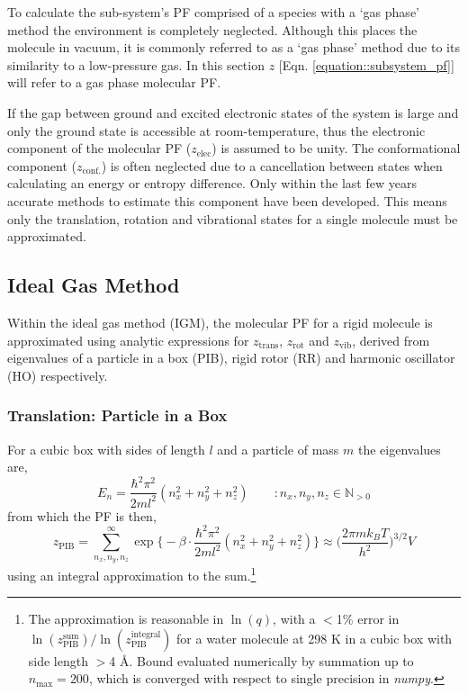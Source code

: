 \documentclass[../main.tex]{subfiles}
\begin{document}
To calculate the sub-system's PF comprised of a species with a `gas phase' method the environment is completely neglected. Although this places the molecule in vacuum, it is commonly referred to as a `gas phase' method due to its similarity to a low-pressure gas. In this section $z$ [Eqn. \eqref{equation::subsystem_pf}] will refer to a gas phase molecular PF.

If the gap between ground and excited electronic states of the system is large and only the ground state is accessible at room-temperature, thus the electronic component of the molecular PF ($z_\text{elec}$) is assumed to be unity. The conformational component ($z_\text{conf.}$) is often neglected due to a cancellation between states when calculating an energy or entropy difference. Only within the last few years accurate methods to estimate this component have been developed.\cite{Chan2021, grimme2021} This means only the translation, rotation and vibrational states for a single molecule must be approximated.

\subsection{Ideal Gas Method}

Within the ideal gas method (IGM), the molecular PF for a rigid molecule is approximated using analytic expressions for $z_\text{trans}$, $z_\text{rot}$ and $z_\text{vib}$, derived from eigenvalues of a particle in a box (PIB), rigid rotor (RR) and harmonic oscillator (HO) respectively.\cite{mcquarrie200}

\subsubsection{Translation: Particle in a Box}

For a cubic box with sides of length $l$ and a particle of mass $m$ the eigenvalues are,
\begin{equation}
E_n = \frac{\hbar^2 \pi^2}{2ml^2}(n_x^2 + n_y^2 + n_z^2) \qquad :  n_x, n_y, n_z \in \mathbb{N}_{>0}
\end{equation}
from which the PF is then,
\begin{equation}
z_\text{PIB} = \sum_{n_x, n_y, n_z}^\infty \exp{ {\Big \{} -{\beta}\cdot  \frac{\hbar^2 \pi^2}{2ml^2}(n_x^2 + n_y^2 + n_z^2)}{\Big \}} \approx  {\Big (} \frac{2\pi m k_B T}{h^2} {\Big )}^{3/2} V 
\label{equation::z_pib_integral}
\end{equation}
using an integral approximation to the sum.\footnote{The approximation is reasonable in $\ln(q)$, with a $<$1\% error in  $\ln(z_\text{PIB}^\text{sum})/\ln(z_\text{PIB}^\text{integral})$ for a water molecule at 298 K in a cubic box with side length $>$4 \AA. Bound evaluated numerically by summation up to $n_\text{max} = 200$, which is converged with respect to single precision in \emph{numpy}.}
\end{document}
